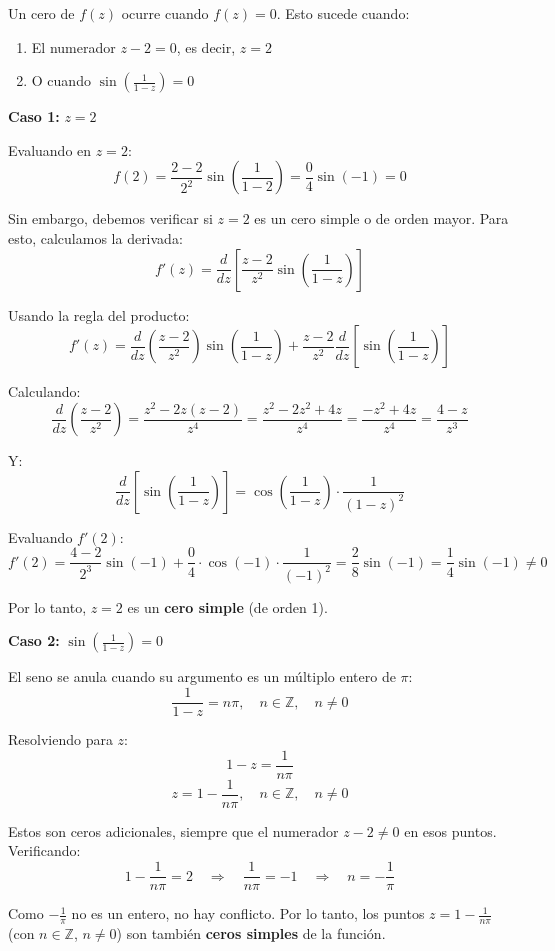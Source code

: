 \documentclass{article}
\begin{document}
Un cero de $f(z)$ ocurre cuando $f(z) = 0$. Esto sucede cuando:
\begin{enumerate}
\item El numerador $z - 2 = 0$, es decir, $z = 2$
\item O cuando $\sin\left(\frac{1}{1 - z}\right) = 0$
\end{enumerate}

\textbf{Caso 1:} $z = 2$

Evaluando en $z = 2$:
$$f(2) = \frac{2 - 2}{2^2} \sin\left(\frac{1}{1 - 2}\right) = \frac{0}{4} \sin(-1) = 0$$

Sin embargo, debemos verificar si $z = 2$ es un cero simple o de orden mayor. Para esto, calculamos la derivada:
$$f'(z) = \frac{d}{dz}\left[\frac{z - 2}{z^2} \sin\left(\frac{1}{1 - z}\right)\right]$$

Usando la regla del producto:
$$f'(z) = \frac{d}{dz}\left(\frac{z - 2}{z^2}\right) \sin\left(\frac{1}{1 - z}\right) + \frac{z - 2}{z^2} \frac{d}{dz}\left[\sin\left(\frac{1}{1 - z}\right)\right]$$

Calculando:
$$\frac{d}{dz}\left(\frac{z - 2}{z^2}\right) = \frac{z^2 - 2z(z - 2)}{z^4} = \frac{z^2 - 2z^2 + 4z}{z^4} = \frac{-z^2 + 4z}{z^4} = \frac{4 - z}{z^3}$$

Y:
$$\frac{d}{dz}\left[\sin\left(\frac{1}{1 - z}\right)\right] = \cos\left(\frac{1}{1 - z}\right) \cdot \frac{1}{(1 - z)^2}$$

Evaluando $f'(2)$:
$$f'(2) = \frac{4 - 2}{2^3} \sin(-1) + \frac{0}{4} \cdot \cos(-1) \cdot \frac{1}{(-1)^2} = \frac{2}{8} \sin(-1) = \frac{1}{4}\sin(-1) \neq 0$$

Por lo tanto, $z = 2$ es un \textbf{cero simple} (de orden 1).

\textbf{Caso 2:} $\sin\left(\frac{1}{1 - z}\right) = 0$

El seno se anula cuando su argumento es un múltiplo entero de $\pi$:
$$\frac{1}{1 - z} = n\pi, \quad n \in \mathbb{Z}, \quad n \neq 0$$

Resolviendo para $z$:
$$1 - z = \frac{1}{n\pi}$$
$$z = 1 - \frac{1}{n\pi}, \quad n \in \mathbb{Z}, \quad n \neq 0$$

Estos son ceros adicionales, siempre que el numerador $z - 2 \neq 0$ en esos puntos. Verificando:
$$1 - \frac{1}{n\pi} = 2 \quad \Rightarrow \quad \frac{1}{n\pi} = -1 \quad \Rightarrow \quad n = -\frac{1}{\pi}$$

Como $-\frac{1}{\pi}$ no es un entero, no hay conflicto. Por lo tanto, los puntos $z = 1 - \frac{1}{n\pi}$ (con $n \in \mathbb{Z}$, $n \neq 0$) son también \textbf{ceros simples} de la función.
\end{document}
